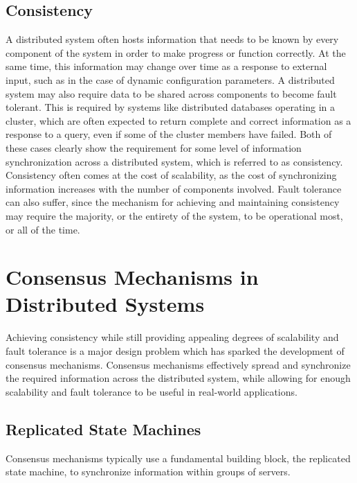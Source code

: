 \subsection{Consistency}

A distributed system often hosts information that needs to be known by every component of the system in order to make progress or function correctly. At the same time, this information may change over time as a response to external input, such as in the case of dynamic configuration parameters. A distributed system may also require data to be shared across components to become fault tolerant. This is required by systems like distributed databases operating in a cluster, which are often expected to return complete and correct information as a response to a query, even if some of the cluster members have failed. Both of these cases clearly show the requirement for some level of information synchronization across a distributed system, which is referred to as consistency.\\

Consistency often comes at the cost of scalability, as the cost of synchronizing information increases with the number of components involved. Fault tolerance can also suffer, since the mechanism for achieving and maintaining consistency may require the majority, or the entirety of the system, to be operational most, or all of the time.\\

\section{Consensus Mechanisms in Distributed Systems}

Achieving consistency while still providing appealing degrees of scalability and fault tolerance is a major design problem which has sparked the development of consensus mechanisms. Consensus mechanisms effectively spread and synchronize the required information across the distributed system, while allowing for enough scalability and fault tolerance to be useful in real-world applications.

\subsection{Replicated State Machines}

Consensus mechanisms typically use a fundamental building block, the replicated state machine, to synchronize information within groups of servers.\\

